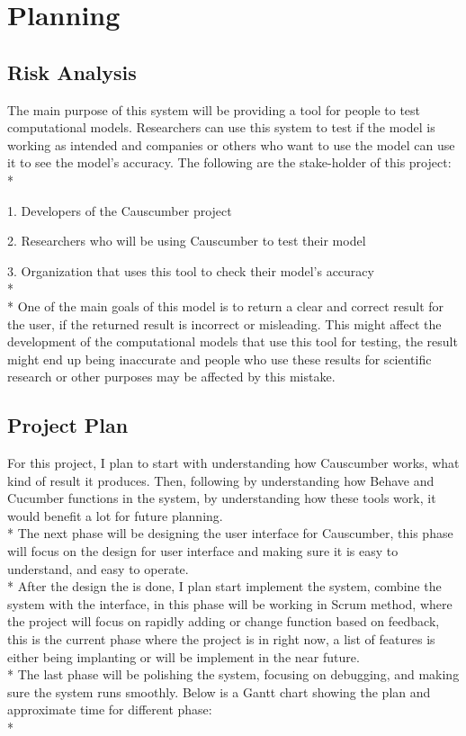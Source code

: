 \chapter{Planning}

\section{Risk Analysis}

The main purpose of this system will be providing a tool for people to test computational models. Researchers can use this system to test if the model is working as intended and companies or others who want to use the model can use it to see the model’s accuracy. The following are the stake-holder of this project:\\*

1.	Developers of the Causcumber project

2.	Researchers who will be using Causcumber to test their model

3.	Organization that uses this tool to check their model’s accuracy
\\*
\\*
One of the main goals of this model is to return a clear and correct result for the user, if the returned result is incorrect or misleading. This might affect the development of the computational models that use this tool for testing, the result might end up being inaccurate and people who use these results for scientific research or other purposes may be affected by this mistake. 

\section{Project Plan}

For this project, I plan to start with understanding how Causcumber works, what kind of result it produces. Then, following by understanding how Behave and Cucumber functions in the system, by understanding how these tools work, it would benefit a lot for future planning. \\*
The next phase will be designing the user interface for Causcumber, this phase will focus on the design for user interface and making sure it is easy to understand, and easy to operate. \\*
After the design the is done, I plan start implement the system, combine the system with the interface, in this phase will be working in Scrum method, where the project will focus on rapidly adding or change function based on feedback, this is the current phase where the project is in right now, a list of features is either being implanting or will be implement in the near future. \\*
The last phase will be polishing the system, focusing on debugging, and making sure the system runs smoothly.
Below is a Gantt chart showing the plan and approximate time for different phase:\\*

